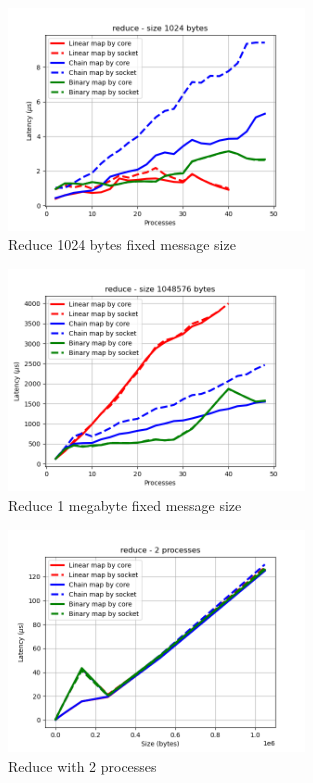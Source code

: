 \begin{figure}[h!]
    \centering
    \includegraphics[width=0.7\textwidth]{../plots/reduce_fixedSize1024.png}
    \caption{Reduce 1024 bytes fixed message size}
    \label{fig:reduce_fixed_message_size_1024}
\end{figure}

\begin{figure}[h!]
    \centering
    \includegraphics[width=0.7\textwidth]{../plots/reduce_fixedSize1048576.png}
    \caption{Reduce 1 megabyte fixed message size}
    \label{fig:reduce_fixed_message_size_1048576}
\end{figure}

\begin{figure}[h!]
    \centering
    \includegraphics[width=0.7\textwidth]{../plots/reduce_fixedProcesses2.png}
    \caption{Reduce with 2 processes}
    \label{fig:reduce_fixed_processes_2}
\end{figure}


